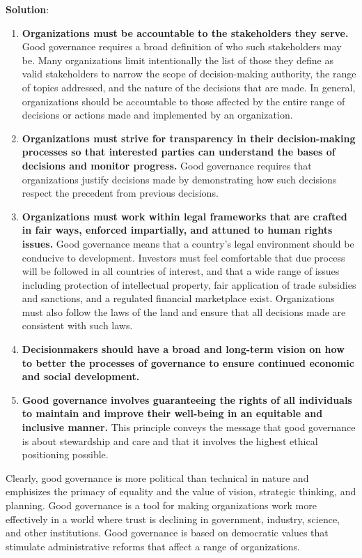 \documentclass[
]{book}
\newenvironment{solution}{ {\bfseries Solution}:}{}
\begin{document}
\begin{questions}
\begin{solution}
\begin{enumerate}
\item \textbf{Organizations must be accountable to the stakeholders they serve.} Good governance requires a broad definition of who such stakeholders may be. Many organizations limit intentionally the list of those they define as valid stakeholders to narrow the scope of decision-making authority, the range of topics addressed, and the nature of the decisions that are made. In general, organizations should be accountable to those affected by the entire range of decisions or actions made and implemented by an organization.
\item \textbf{Organizations must strive for transparency in their decision-making processes so that interested parties can understand the bases of decisions and monitor progress.} Good governance requires that organizations justify decisions made by demonstrating how such decisions respect the precedent from previous decisions.
\item \textbf{Organizations must work within legal frameworks that are crafted in fair ways, enforced impartially, and attuned to human rights issues.} Good governance means that a country’s legal environment should be conducive to development. Investors must feel comfortable that due process will be followed in all countries of interest, and that a wide range of issues including protection of intellectual property, fair application of trade subsidies and sanctions, and a regulated financial marketplace exist. Organizations must also follow the laws of the land and ensure that all decisions made are consistent with such laws.
\item \textbf{Decisionmakers should have a broad and long-term vision on how to better the processes of governance to ensure continued economic and social development.}
\item \textbf{Good governance involves guaranteeing the rights of all individuals to maintain and improve their well-being in an equitable and inclusive manner.} This principle conveys the message that good governance is about stewardship and care and that it involves the highest ethical positioning possible.
\end{enumerate}

Clearly, good governance is more political than technical in nature and emphisizes the primacy of equality and the value of vision, strategic thinking, and planning. Good governance is a tool for making organizations work more effectively in a world where trust is declining in government, industry, science, and other institutions. Good governance is based on democratic values that stimulate administrative reforms that affect a range of organizations.


\end{solution}
\end{questions}
\end{document}
